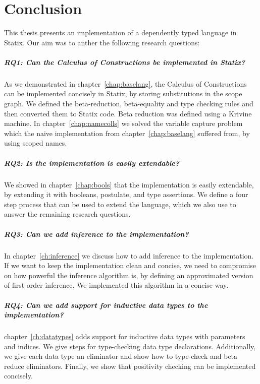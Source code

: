 \chapter{Conclusion}
\label{ch:conclusion}

This thesis presents an implementation of a dependently typed language in Statix. Our aim was to anther the following research questions:

\paragraph{RQ1: Can the Calculus of Constructions be implemented in Statix?}
As we demonstrated in chapter~\ref{chap:baselang}, the Calculus of Constructions can be implemented concisely in Statix, by storing substitutions in the scope graph. We defined the beta-reduction, beta-equality and type checking rules and then converted them to Statix code. Beta reduction was defined using a Krivine machine. In chapter~\ref{chap:namecolls} we solved the variable capture problem which the naive implementation from chapter~\ref{chap:baselang} suffered from, by using scoped names.

\paragraph{RQ2: Is the implementation is easily extendable?}
We showed in chapter~\ref{chap:bools} that the implementation is easily extendable, by extending it with booleans, postulate, and type assertions. We define a four step process that can be used to extend the language, which we also use to answer the remaining research questions.

\paragraph{RQ3: Can we add inference to the implementation?}
In chapter~\ref{ch:inference} we discuss how to add inference to the implementation. If we want to keep the implementation clean and concise, we need to compromise on how powerful the inference algorithm is, by defining an approximated version of first-order inference. We implemented this algorithm in a concise way.

\paragraph{RQ4: Can we add support for inductive data types to the implementation?}
chapter~\ref{ch:datatypes} adds support for inductive data types with parameters and indices. We give steps for type-checking data type declarations. Additionally, we give each data type an eliminator and show how to type-check and beta reduce eliminators. Finally, we show that positivity checking can be implemented concisely.


